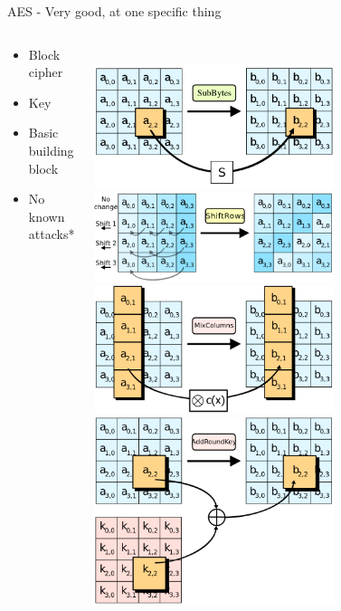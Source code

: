 \documentclass[10pt, compress]{beamer}
\begin{document}
\begin{frame}{AES - Very good, at one specific thing}
  \begin{columns}
    \begin{column}{0.5\textwidth}
      \begin{itemize}
        \item Block cipher
        \item Key
        \item Basic building block
        \item No known attacks*
      \end{itemize}
    \end{column}
    \begin{column}{0.5\textwidth}
      \\
      \includegraphics[width=0.65\textwidth]{images/aes-sub.png} \\
      \includegraphics[width=0.65\textwidth]{images/aes-shift.png} \\
      \includegraphics[width=0.65\textwidth]{images/aes-mixcolumns.png}\\
      \includegraphics[width=0.65\textwidth]{images/aes-roundkey.png} \\
    \end{column}
  \end{columns}



\end{frame}
\end{document}

